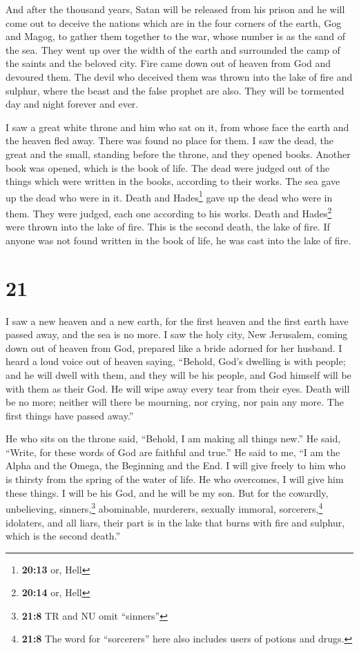  And after the thousand years, Satan will be released from
his prison  and he will come out to deceive the nations
which are in the four corners of the earth, Gog and Magog, to gather
them together to the war, whose number is as the sand of the sea.
 They went up over the width of the earth and surrounded
the camp of the saints and the beloved city. Fire came down out of
heaven from God and devoured them.  The devil who
deceived them was thrown into the lake of fire and sulphur, where the
beast and the false prophet are also. They will be tormented day and
night forever and ever.

 I saw a great white throne and him who sat on it, from
whose face the earth and the heaven fled away. There was found no place
for them.  I saw the dead, the great and the small,
standing before the throne, and they opened books. Another book was
opened, which is the book of life. The dead were judged out of the
things which were written in the books, according to their works.
 The sea gave up the dead who were in it. Death and
Hades\footnote{\textbf{20:13} or, Hell} gave up the dead who were in
them. They were judged, each one according to his works. 
Death and Hades\footnote{\textbf{20:14} or, Hell} were thrown into the
lake of fire. This is the second death, the lake of fire.
 If anyone was not found written in the book of life, he
was cast into the lake of fire.

\hypertarget{section-20}{%
\section{21}\label{section-20}}

 I saw a new heaven and a new earth, for the first heaven
and the first earth have passed away, and the sea is no more.
 I saw the holy city, New Jerusalem, coming down out of
heaven from God, prepared like a bride adorned for her husband.
 I heard a loud voice out of heaven saying, ``Behold,
God's dwelling is with people; and he will dwell with them, and they
will be his people, and God himself will be with them as their God.
 He will wipe away every tear from their eyes. Death will
be no more; neither will there be mourning, nor crying, nor pain any
more. The first things have passed away.''

 He who sits on the throne said, ``Behold, I am making all
things new.'' He said, ``Write, for these words of God are faithful and
true.''  He said to me, ``I am the Alpha and the Omega,
the Beginning and the End. I will give freely to him who is thirsty from
the spring of the water of life.  He who overcomes, I will
give him these things. I will be his God, and he will be my son.
 But for the cowardly, unbelieving, sinners,\footnote{\textbf{21:8}
  TR and NU omit ``sinners''} abominable, murderers, sexually immoral,
sorcerers,\footnote{\textbf{21:8} The word for ``sorcerers'' here also
  includes users of potions and drugs.} idolaters, and all liars, their
part is in the lake that burns with fire and sulphur, which is the
second death.''

